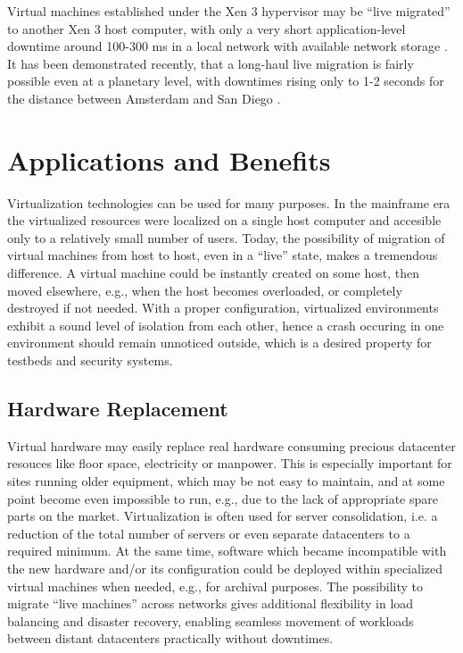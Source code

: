 \documentclass[11pt,a4paper]{llncs}
\begin{document}
Virtual machines established under the Xen 3 hypervisor may be ``live migrated''
to another Xen 3 host computer, with only a very short application-level 
downtime around 100-300 ms in a local network with available network storage 
\cite{Xen2005}. 
It has been demonstrated recently, that a long-haul live migration is fairly
possible even at a planetary level, with downtimes rising only to 1-2 seconds 
for the distance between Amsterdam and San Diego \cite{FGCS22_901}.



\section{Applications and Benefits}


Virtualization technologies can be used for many purposes. In the mainframe
era the virtualized resources were localized on a single host computer and
accesible only to a relatively small number of users. 
Today, the possibility of migration of virtual machines from host to host, 
even in a ``live'' state, makes a tremendous difference. A virtual machine
could be instantly created on some host, then moved elsewhere, e.g., when 
the host becomes overloaded, or completely destroyed if not needed.
With a proper configuration, virtualized environments exhibit a sound level
of isolation from each other, hence a crash occuring in one environment
should remain unnoticed outside, which is a desired property for testbeds 
and security systems.



\subsection{Hardware Replacement}


Virtual hardware may easily replace real hardware consuming precious 
datacenter resouces like floor space, electricity or manpower. This
is especially important for sites running older equipment, which may 
be not easy to maintain, and at some point become even impossible to run,
e.g., due to the lack of appropriate spare parts on the market.
Virtualization is often used for server consolidation, i.e. a reduction 
of the total number of servers or even separate datacenters to a required 
minimum. 
At the same time, software which became incompatible with the new hardware 
and/or its configuration could be deployed within specialized virtual machines 
when needed, e.g., for archival purposes.
The possibility to migrate ``live machines'' across networks gives additional
flexibility in load balancing and disaster recovery, enabling  seamless
movement of workloads between distant datacenters  practically
without downtimes.
\end{document}
